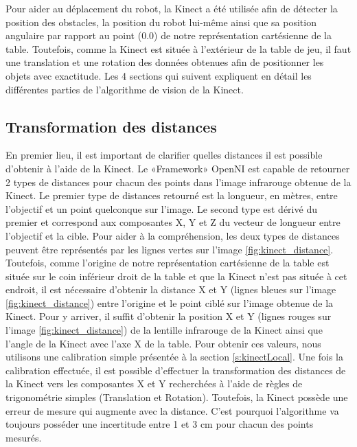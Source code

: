 Pour aider au déplacement du robot, la Kinect a été utilisée afin de détecter la position des obstacles, la position du robot lui-même ainsi que sa position angulaire par rapport au point (0.0) de notre représentation cartésienne de la table. Toutefois, comme la Kinect est située à l'extérieur de la table de jeu, il faut une translation et une rotation des données obtenues afin de positionner les objets avec exactitude. Les 4 sections qui suivent expliquent en détail les différentes parties de l'algorithme de vision de la Kinect.

\subsection{Transformation des distances}
En premier lieu, il est important de clarifier quelles distances il est possible d'obtenir à l'aide de la Kinect. Le «Framework» OpenNI est capable de retourner 2 types de distances pour chacun des points dans l'image infrarouge obtenue de la Kinect. Le premier type de distances retourné est la longueur, en mètres, entre l'objectif et un point quelconque sur l'image. Le second type est dérivé du premier et correspond aux composantes X, Y et Z du vecteur de longueur entre l'objectif et la cible. Pour aider à la compréhension, les deux types de distances peuvent être représentés par les lignes vertes sur l'image \ref{fig:kinect_distance}. Toutefois, comme l'origine de notre représentation cartésienne de la table est située sur le coin inférieur droit de la table et que la Kinect n'est pas située à cet endroit, il est nécessaire d'obtenir la distance X et Y (lignes bleues sur l'image \ref{fig:kinect_distance}) entre l'origine et le point ciblé sur l'image obtenue de la Kinect. Pour y arriver, il suffit d'obtenir la position X et Y (lignes rouges sur l'image \ref{fig:kinect_distance}) de la lentille infrarouge de la Kinect ainsi que l'angle de la Kinect avec l'axe X de la table. Pour obtenir ces valeurs, nous utilisons une calibration simple présentée à la section \ref{s:kinectLocal}. Une fois la calibration effectuée, il est possible d'effectuer la transformation des distances de la Kinect vers les composantes X et Y recherchées à l'aide de règles de trigonométrie simples (Translation et Rotation). Toutefois, la Kinect possède une erreur de mesure qui augmente avec la distance. C'est pourquoi l'algorithme va toujours posséder une incertitude entre 1 et 3 cm pour chacun des points mesurés.

